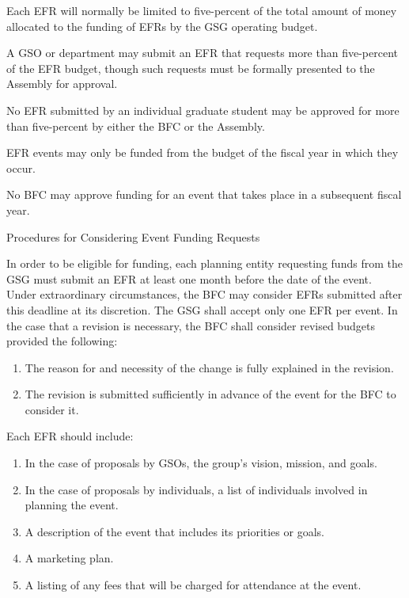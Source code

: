 \begin{bylaws-number}
\begin{bylaws-number}
  \item Each EFR will normally be limited to five-percent of the total amount of money allocated to the funding of EFRs by the GSG operating budget.
  \item A GSO or department may submit an EFR that requests more than five-percent of the EFR budget, though such requests must be formally presented to the Assembly for approval.
  \item No EFR submitted by an individual graduate student may be approved for more than five-percent by either the BFC or the Assembly.
  \item EFR events may only be funded from the budget of the fiscal year in which they occur.
  \item No BFC may approve funding for an event that takes place in a subsequent fiscal year.
\end{bylaws-number}
  \item Procedures for Considering Event Funding Requests
\begin{bylaws-number}
  \item In order to be eligible for funding, each planning entity requesting funds from the GSG must submit an EFR at least one month before the date of the event. Under extraordinary circumstances, the BFC may consider EFRs submitted after this deadline at its discretion. The GSG shall accept only one EFR per event. In the case that a revision is necessary, the BFC shall consider revised budgets provided the following:
\begin{enumerate}[i]
  \item The reason for and necessity of the change is fully explained in the revision.
  \item The revision is submitted sufficiently in advance of the event for the BFC to consider it.
\end{enumerate}
  \item Each EFR should include:
\begin{enumerate}[i]
  \item In the case of proposals by GSOs, the group’s vision, mission, and goals.
  \item In the case of proposals by individuals, a list of individuals involved in planning the event.
  \item A description of the event that includes its priorities or goals.
  \item A marketing plan.
  \item A listing of any fees that will be charged for attendance at the event.

\end{enumerate}
\end{bylaws-number}
\end{bylaws-number}
